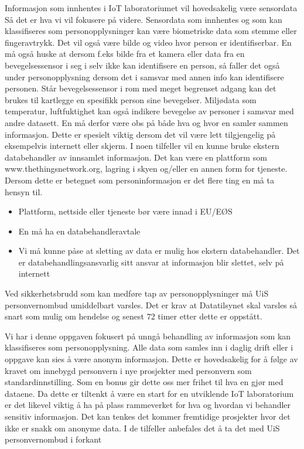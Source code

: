 \documentclass{article}
\begin{document}
Informasjon som innhentes i IoT laboratoriumet vil hovedsakelig være sensordata Så det er hva vi vil fokusere på videre. Sensordata som innhentes og som kan klassifiseres som personopplysninger kan være biometriske data som stemme eller fingeravtrykk. Det vil også være bilde og video hvor person er identifiserbar. En må også huske at dersom f.eks bilde fra et kamera eller data fra en bevegelsessensor i seg i selv ikke kan identifisere en person, så faller det også under personopplysning dersom det i samsvar med annen info kan identifisere personen. Står bevegelsessensor i rom med meget begrenset adgang kan det brukes til kartlegge en spesifikk person sine bevegelser. Miljødata som temperatur, luftfuktighet kan også indikere bevegelse av personer i samsvar med andre datasett. En må derfor være obs på både hva og hvor en samler sammen informasjon. Dette er spesielt viktig dersom det vil være lett tilgjengelig på eksempelvis internett eller skjerm. \newline
I noen tilfeller vil en kunne bruke  ekstern databehandler av innsamlet informasjon. Det kan være en plattform som www.thethingsnetwork.org, lagring i skyen og/eller en annen form for tjeneste. Dersom dette er betegnet som personinformasjon er det flere ting en må ta hensyn til.

\begin{itemize}
	\item Plattform, nettside eller tjeneste bør være innad i EU/EØS
	\item En må ha en databehandleravtale
	\item Vi må kunne påse at sletting av data er mulig hos ekstern databehandler. Det er databehandlingsansvarlig sitt ansvar at informasjon blir slettet, selv på internett
\end{itemize}

Ved sikkerhetsbrudd som kan medføre tap av personopplysninger må UiS personvernombud umiddelbart varsles. Det er krav at Datatilsynet skal varsles så snart som mulig om hendelse og senest 72 timer etter dette er oppstått. 

Vi har i denne oppgaven fokusert på unngå behandling av informasjon som kan klassifiseres som personopplysning. Alle data som samles inn i daglig drift eller i oppgave kan sies å være anonym informasjon. Dette er hovedsakelig for å følge av kravet om innebygd personvern i nye prosjekter med personvern som standardinnstilling. Som en bonus gir dette oss mer frihet til hva en gjør med dataene. Da dette er tiltenkt å være en start for en utviklende IoT laboratorium er det likevel viktig å ha på plass rammeverket for hva og hvordan vi behandler sensitiv informasjon. Det kan tenkes det kommer fremtidige prosjekter hvor det ikke er snakk om anonyme data. I de tilfeller anbefales det å ta det med UiS personvernombud i forkant
\end{document}
